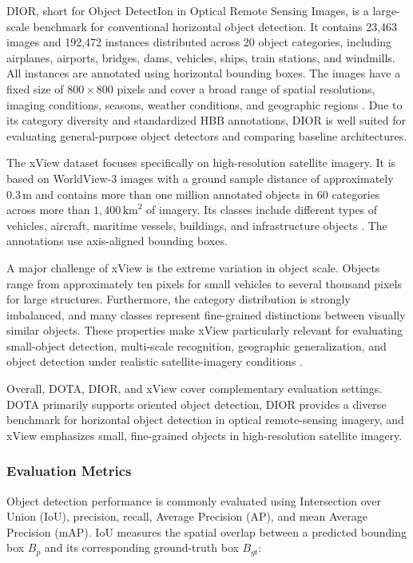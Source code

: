 DIOR, short for Object DetectIon in Optical Remote Sensing Images, is a large-scale benchmark for conventional horizontal object detection. It contains 23,463 images and 192,472 instances distributed across 20 object categories, including airplanes, airports, bridges, dams, vehicles, ships, train stations, and windmills. All instances are annotated using horizontal bounding boxes. The images have a fixed size of $800 \times 800$ pixels and cover a broad range of spatial resolutions, imaging conditions, seasons, weather conditions, and geographic regions \cite{li2020object}. Due to its category diversity and standardized HBB annotations, DIOR is well suited for evaluating general-purpose object detectors and comparing baseline architectures.

The xView dataset focuses specifically on high-resolution satellite imagery. It is based on WorldView-3 images with a ground sample distance of approximately $0.3\,\mathrm{m}$ and contains more than one million annotated objects in 60 categories across more than $1{,}400\,\mathrm{km}^2$ of imagery. Its classes include different types of vehicles, aircraft, maritime vessels, buildings, and infrastructure objects \cite{lam2018xview}. The annotations use axis-aligned bounding boxes.

A major challenge of xView is the extreme variation in object scale. Objects range from approximately ten pixels for small vehicles to several thousand pixels for large structures. Furthermore, the category distribution is strongly imbalanced, and many classes represent fine-grained distinctions between visually similar objects. These properties make xView particularly relevant for evaluating small-object detection, multi-scale recognition, geographic generalization, and object detection under realistic satellite-imagery conditions \cite{lam2018xview}.

Overall, DOTA, DIOR, and xView cover complementary evaluation settings. DOTA primarily supports oriented object detection, DIOR provides a diverse benchmark for horizontal object detection in optical remote-sensing imagery, and xView emphasizes small, fine-grained objects in high-resolution satellite imagery.

\subsubsection{Evaluation Metrics}

Object detection performance is commonly evaluated using Intersection over Union (IoU), precision, recall, Average Precision (AP), and mean Average Precision (mAP). IoU measures the spatial overlap between a predicted bounding box $B_p$ and its corresponding ground-truth box $B_{gt}$:

